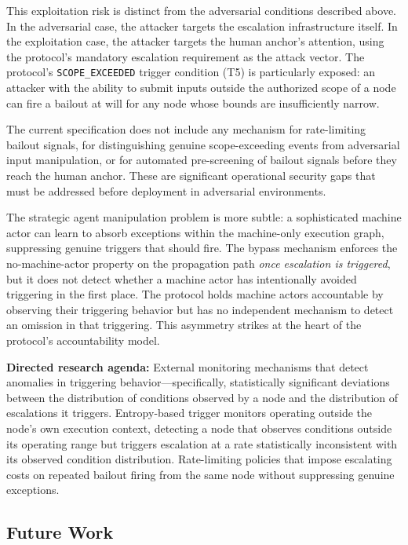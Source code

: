 This exploitation risk is distinct from the adversarial conditions described above. In the adversarial case, the attacker targets the escalation infrastructure itself. In the exploitation case, the attacker targets the human anchor's attention, using the protocol's mandatory escalation requirement as the attack vector. The protocol's \texttt{SCOPE\_EXCEEDED} trigger condition (T5) is particularly exposed: an attacker with the ability to submit inputs outside the authorized scope of a node can fire a bailout at will for any node whose bounds are insufficiently narrow.

The current specification does not include any mechanism for rate-limiting bailout signals, for distinguishing genuine scope-exceeding events from adversarial input manipulation, or for automated pre-screening of bailout signals before they reach the human anchor. These are significant operational security gaps that must be addressed before deployment in adversarial environments.

The strategic agent manipulation problem is more subtle: a sophisticated machine actor can learn to absorb exceptions within the machine-only execution graph, suppressing genuine triggers that should fire. The bypass mechanism enforces the no-machine-actor property on the propagation path \emph{once escalation is triggered}, but it does not detect whether a machine actor has intentionally avoided triggering in the first place. The protocol holds machine actors accountable by observing their triggering behavior but has no independent mechanism to detect an omission in that triggering. This asymmetry strikes at the heart of the protocol's accountability model.

\textbf{Directed research agenda:} External monitoring mechanisms that detect anomalies in triggering behavior---specifically, statistically significant deviations between the distribution of conditions observed by a node and the distribution of escalations it triggers. Entropy-based trigger monitors operating outside the node's own execution context, detecting a node that observes conditions outside its operating range but triggers escalation at a rate statistically inconsistent with its observed condition distribution. Rate-limiting policies that impose escalating costs on repeated bailout firing from the same node without suppressing genuine exceptions.

\subsection{Future Work}
\label{sec:future-work}

